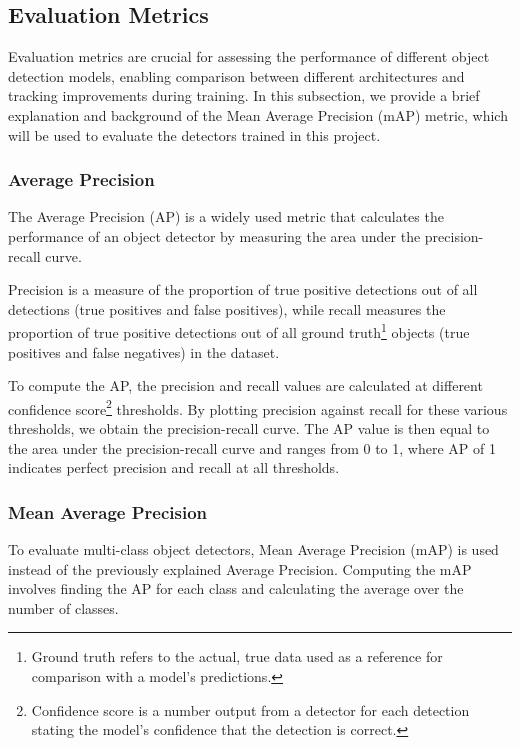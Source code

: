\subsection{Evaluation Metrics}

Evaluation metrics are crucial for assessing the performance of different object
detection models, enabling comparison between different architectures and
tracking improvements during training. In this subsection, we provide a brief
explanation and background of the Mean Average Precision (mAP) metric, which
will be used to evaluate the detectors trained in this project.


\subsubsection{Average Precision}

The Average Precision (AP) is a widely used metric that calculates the
performance of an object detector by measuring the area under the
precision-recall curve.

Precision is a measure of the proportion of true positive detections out of all
detections (true positives and false positives), while recall measures the
proportion of true positive detections out of all ground truth\footnote{Ground
truth refers to the actual, true data used as a reference for comparison with a
model's predictions.} objects (true positives and false negatives) in the
dataset.

To compute the AP, the precision and recall values are calculated at different
confidence score\footnote{Confidence score is a number output from a detector
for each detection stating the model's confidence that the detection is
correct.} thresholds. By plotting precision against recall for these various
thresholds, we obtain the precision-recall curve. The AP value is then equal to
the area under the precision-recall curve and ranges from 0 to 1, where AP of 1
indicates perfect precision and recall at all thresholds.



\subsubsection{Mean Average Precision}

To evaluate multi-class object detectors, Mean Average Precision (mAP) is used
instead of the previously explained Average Precision. Computing the mAP
involves finding the AP for each class and calculating the average over the
number of classes.

